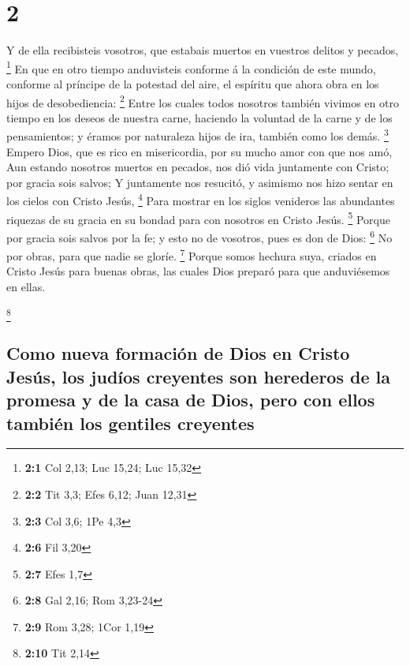 \hypertarget{section-1}{%
\section{2}\label{section-1}}

 Y de ella recibisteis vosotros, que estabais muertos en
vuestros delitos y pecados, \footnote{\textbf{2:1} Col 2,13; Luc 15,24;
  Luc 15,32}  En que en otro tiempo anduvisteis conforme á
la condición de este mundo, conforme al príncipe de la potestad del
aire, el espíritu que ahora obra en los hijos de desobediencia:
\footnote{\textbf{2:2} Tit 3,3; Efes 6,12; Juan 12,31} 
Entre los cuales todos nosotros también vivimos en otro tiempo en los
deseos de nuestra carne, haciendo la voluntad de la carne y de los
pensamientos; y éramos por naturaleza hijos de ira, también como los
demás. \footnote{\textbf{2:3} Col 3,6; 1Pe 4,3}  Empero
Dios, que es rico en misericordia, por su mucho amor con que nos amó,
 Aun estando nosotros muertos en pecados, nos dió vida
juntamente con Cristo; por gracia sois salvos;  Y juntamente
nos resucitó, y asimismo nos hizo sentar en los cielos con Cristo Jesús,
\footnote{\textbf{2:6} Fil 3,20}  Para mostrar en los siglos
venideros las abundantes riquezas de su gracia en su bondad para con
nosotros en Cristo Jesús. \footnote{\textbf{2:7} Efes 1,7} 
Porque por gracia sois salvos por la fe; y esto no de vosotros, pues es
don de Dios: \footnote{\textbf{2:8} Gal 2,16; Rom 3,23-24} 
No por obras, para que nadie se gloríe. \footnote{\textbf{2:9} Rom 3,28;
  1Cor 1,19}  Porque somos hechura suya, criados en Cristo
Jesús para buenas obras, las cuales Dios preparó para que anduviésemos
en ellas.

\footnote{\textbf{2:10} Tit 2,14}

\hypertarget{como-nueva-formaciuxf3n-de-dios-en-cristo-jesuxfas-los-juduxedos-creyentes-son-herederos-de-la-promesa-y-de-la-casa-de-dios-pero-con-ellos-tambiuxe9n-los-gentiles-creyentes}{%
\subsection{Como nueva formación de Dios en Cristo Jesús, los judíos
creyentes son herederos de la promesa y de la casa de Dios, pero con
ellos también los gentiles
creyentes}\label{como-nueva-formaciuxf3n-de-dios-en-cristo-jesuxfas-los-juduxedos-creyentes-son-herederos-de-la-promesa-y-de-la-casa-de-dios-pero-con-ellos-tambiuxe9n-los-gentiles-creyentes}}

